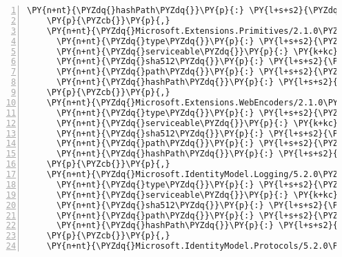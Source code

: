 \begin{Verbatim}[commandchars=\\\{\},numbers=left,firstnumber=1,stepnumber=1,numberblanklines=0]
      \PY{n+nt}{\PYZdq{}hashPath\PYZdq{}}\PY{p}{:} \PY{l+s+s2}{\PYZdq{}microsoft.extensions.options.configurationextensions.2.1.0\PYZhy{}rc1\PYZhy{}final.nupkg.sha512\PYZdq{}}
    \PY{p}{\PYZcb{}}\PY{p}{,}
    \PY{n+nt}{\PYZdq{}Microsoft.Extensions.Primitives/2.1.0\PYZhy{}rc1\PYZhy{}final\PYZdq{}}\PY{p}{:} \PY{p}{\PYZob{}}
      \PY{n+nt}{\PYZdq{}type\PYZdq{}}\PY{p}{:} \PY{l+s+s2}{\PYZdq{}package\PYZdq{}}\PY{p}{,}
      \PY{n+nt}{\PYZdq{}serviceable\PYZdq{}}\PY{p}{:} \PY{k+kc}{true}\PY{p}{,}
      \PY{n+nt}{\PYZdq{}sha512\PYZdq{}}\PY{p}{:} \PY{l+s+s2}{\PYZdq{}sha512\PYZhy{}8/HE3J4odAimkLLhGpozXhgPRNWRO12vup46QqoLJv5orrEqZrekeQPYSN6EM5C9j6S9MhRNQj8t0Tsm3DYylg==\PYZdq{}}\PY{p}{,}
      \PY{n+nt}{\PYZdq{}path\PYZdq{}}\PY{p}{:} \PY{l+s+s2}{\PYZdq{}microsoft.extensions.primitives/2.1.0\PYZhy{}rc1\PYZhy{}final\PYZdq{}}\PY{p}{,}
      \PY{n+nt}{\PYZdq{}hashPath\PYZdq{}}\PY{p}{:} \PY{l+s+s2}{\PYZdq{}microsoft.extensions.primitives.2.1.0\PYZhy{}rc1\PYZhy{}final.nupkg.sha512\PYZdq{}}
    \PY{p}{\PYZcb{}}\PY{p}{,}
    \PY{n+nt}{\PYZdq{}Microsoft.Extensions.WebEncoders/2.1.0\PYZhy{}rc1\PYZhy{}final\PYZdq{}}\PY{p}{:} \PY{p}{\PYZob{}}
      \PY{n+nt}{\PYZdq{}type\PYZdq{}}\PY{p}{:} \PY{l+s+s2}{\PYZdq{}package\PYZdq{}}\PY{p}{,}
      \PY{n+nt}{\PYZdq{}serviceable\PYZdq{}}\PY{p}{:} \PY{k+kc}{true}\PY{p}{,}
      \PY{n+nt}{\PYZdq{}sha512\PYZdq{}}\PY{p}{:} \PY{l+s+s2}{\PYZdq{}sha512\PYZhy{}sxbihnAZ2dVbFQqoWjugdAxkzR2Rl/B/RaBsHH8LFRNjLcKPgwlqzo6hgmlvWWI7Mv4yQDL8R7RsuFZ/LFJx2w==\PYZdq{}}\PY{p}{,}
      \PY{n+nt}{\PYZdq{}path\PYZdq{}}\PY{p}{:} \PY{l+s+s2}{\PYZdq{}microsoft.extensions.webencoders/2.1.0\PYZhy{}rc1\PYZhy{}final\PYZdq{}}\PY{p}{,}
      \PY{n+nt}{\PYZdq{}hashPath\PYZdq{}}\PY{p}{:} \PY{l+s+s2}{\PYZdq{}microsoft.extensions.webencoders.2.1.0\PYZhy{}rc1\PYZhy{}final.nupkg.sha512\PYZdq{}}
    \PY{p}{\PYZcb{}}\PY{p}{,}
    \PY{n+nt}{\PYZdq{}Microsoft.IdentityModel.Logging/5.2.0\PYZdq{}}\PY{p}{:} \PY{p}{\PYZob{}}
      \PY{n+nt}{\PYZdq{}type\PYZdq{}}\PY{p}{:} \PY{l+s+s2}{\PYZdq{}package\PYZdq{}}\PY{p}{,}
      \PY{n+nt}{\PYZdq{}serviceable\PYZdq{}}\PY{p}{:} \PY{k+kc}{true}\PY{p}{,}
      \PY{n+nt}{\PYZdq{}sha512\PYZdq{}}\PY{p}{:} \PY{l+s+s2}{\PYZdq{}sha512\PYZhy{}OgiaeDGsuTpXrx77a4gyN6Flp4y7jro4La92UtVEEVxnRb+TnRxawVYY3Z5EVme5fSwvE31vo2iNAwI/jBKjPg==\PYZdq{}}\PY{p}{,}
      \PY{n+nt}{\PYZdq{}path\PYZdq{}}\PY{p}{:} \PY{l+s+s2}{\PYZdq{}microsoft.identitymodel.logging/5.2.0\PYZdq{}}\PY{p}{,}
      \PY{n+nt}{\PYZdq{}hashPath\PYZdq{}}\PY{p}{:} \PY{l+s+s2}{\PYZdq{}microsoft.identitymodel.logging.5.2.0.nupkg.sha512\PYZdq{}}
    \PY{p}{\PYZcb{}}\PY{p}{,}
    \PY{n+nt}{\PYZdq{}Microsoft.IdentityModel.Protocols/5.2.0\PYZdq{}}\PY{p}{:} \PY{p}{\PYZob{}}

\end{Verbatim}
